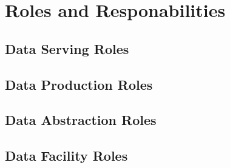 \section{Roles and Responabilities} \label{sec:roles}



\subsection{Data Serving Roles}



\subsection{Data Production Roles}




\subsection{Data Abstraction Roles}



\subsection{Data Facility Roles}







